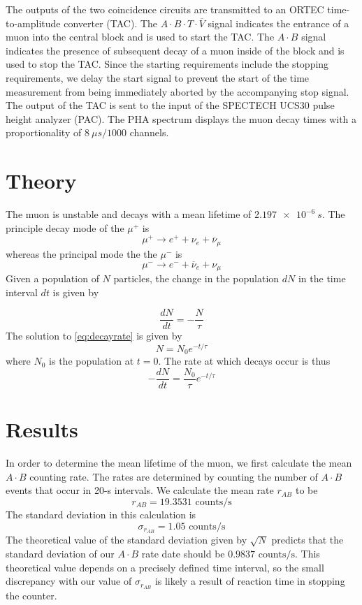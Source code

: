 \documentclass[aps, reprint,amsmath,amssymb]{revtex4-1} %
\begin{document}
The outputs of the two coincidence circuits are transmitted to an ORTEC time-to-amplitude converter (TAC). The $A \cdot B \cdot T \cdot \overline{V}$ signal indicates the entrance of a muon into the central block and is used to start the TAC. The $A \cdot B$ signal indicates the presence of subsequent decay of a muon inside of the block and is used to stop the TAC. Since the starting requirements include the stopping requirements, we delay the start signal to prevent the start of the time measurement from being immediately aborted by the accompanying stop signal. The output of the TAC is sent to the input of the SPECTECH UCS30 pulse height analyzer (PAC). The PHA spectrum displays the muon decay times with a proportionality of $\SI{8}{\mu s}/1000$ channels.

\section{Theory}

The muon is unstable and decays with a mean lifetime of $\SI{2.197e-6}{s}$. The principle decay mode of the $\mu^+$ is
\[
	\mu^+ \rightarrow e^+ + \nu_e + \overline{\nu}_{\mu}
\]
whereas the principal mode the the $\mu^-$ is
\[
	\mu^- \rightarrow e^- + \overline{\nu}_e + \nu_{\mu}
\]
Given a population of $N$ particles, the change in the population $dN$ in the time interval $dt$ is given by

\begin{equation} \label{eq:decayrate}
    \frac{dN}{dt} = - \frac{N}{\tau}
\end{equation}
The solution to \eqref{eq:decayrate} is given by
\begin{equation} \label{eq:decayratesoln}
	N = N_0 e^{-t/\tau}
\end{equation}
where $N_0$ is the population at $t=0$. The rate at which decays occur is thus
\[
	-\frac{dN}{dt} = \frac{N_0}{\tau} e^{-t/\tau}
\]


\section{Results}

In order to determine the mean lifetime of the muon, we first calculate the mean $A \cdot B$ counting rate. The rates are determined by counting the number of $A \cdot B$ events that occur in 20-s intervals. We calculate the mean rate $r_{AB}$ to be
\[
	r_{AB} = 19.3531 \text{ counts}/\text{s}
\]
The standard deviation in this calculation is
\[
	\sigma_{r_{AB}} = 1.05 \text{ counts}/\text{s}
\]
The theoretical value of the standard deviation given by $\sqrt{N}$ predicts that the standard deviation of our $A \cdot B$ rate date should be $0.9837 \text{ counts}/\text{s}$. This theoretical value depends on a precisely defined time interval, so the small discrepancy with our value of $\sigma_{r_{AB}}$ is likely a result of reaction time in stopping the counter. 
\end{document}

